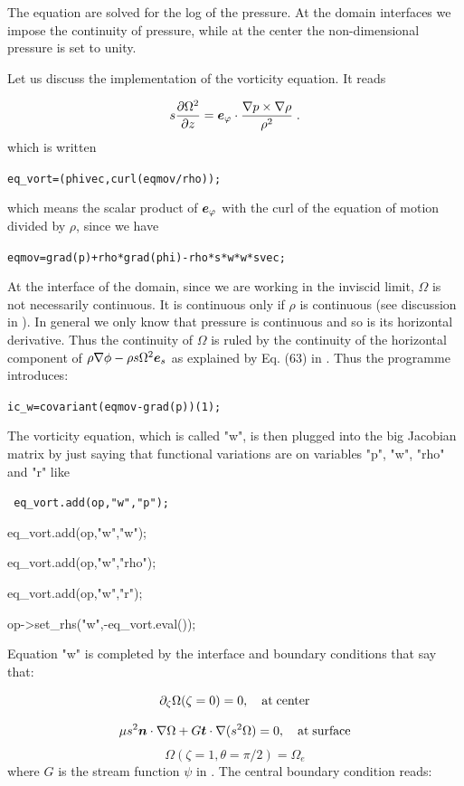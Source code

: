 The equation are solved for the log of the pressure. At the domain
interfaces we impose the continuity of pressure, while at the center the
non-dimensional pressure is set to unity.

Let us discuss the implementation of the vorticity equation. It reads

\[ s\frac{\partial\Omega^2}{\partial z}=\ephi\cdot\frac{\na
p\times\na\rho}{\rho^2} \;.
\]
which is written

\centerline{\tt eq\_vort=(phivec,curl(eqmov/rho));}
\bigskip
\noindent which means the scalar product of $\ephi$ with the curl of
the equation of motion divided by $\rho$, since we have

\bigskip
\centerline{\tt eqmov=grad(p)+rho*grad(phi)-rho*s*w*w*svec;}
\bigskip

At the interface of the domain, since we are working in the inviscid
limit, $\Omega$ is not necessarily continuous. It is continuous only if
$\rho$ is continuous (see discussion in \citealt{ELR13}). In general we
only know that pressure is continuous and so is its horizontal
derivative. Thus the continuity of $\Omega$ is ruled by the continuity
of the horizontal component of $\rho\na\phi-\rho s\Omega^2\es$ as
explained by Eq. (63) in \cite{ELR13}. Thus the programme introduces:

\bigskip
\centerline{\tt ic\_w=covariant(eqmov-grad(p))(1);
}
\bigskip

The vorticity equation, which is called "w", is then plugged into the
big Jacobian matrix by just saying that  functional variations are on
variables "p", "w", "rho" and "r" like

\begin{center}
{\tt
        eq\_vort.add(op,"w","p"); \par
        eq\_vort.add(op,"w","w"); \par
        eq\_vort.add(op,"w","rho"); \par
        eq\_vort.add(op,"w","r"); \par
        op->set\_rhs("w",-eq\_vort.eval()); \par
}

\end{center}
Equation "w" is completed by the interface and boundary conditions that
say that:

\[ \partial_\zeta\Omega(\zeta=0) = 0,\quad {\rm at\; center} \]

\[ \mu s^2\vn\cdot\na\Omega +
G\vec{t}\cdot\na(s^2\Omega)=0,\quad {\rm at\; surface} \]
\[ \Omega(\zeta=1,\theta=\pi/2) = \Omega_e\]
where $G$ is the stream function $\psi$ in .
The central boundary condition reads:
\bigskip


